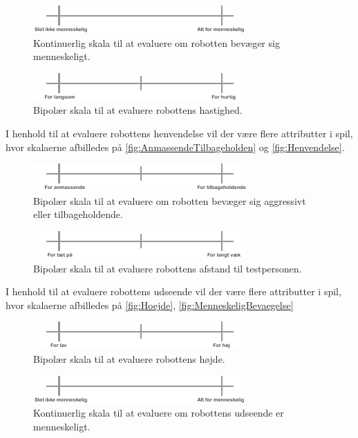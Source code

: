 \noindent
%
%
\begin{figure}[H]
\centering
\includegraphics[width =\textwidth]{Figure/Menneskelig} 
\caption{Kontinuerlig skala til at evaluere om robotten bevæger sig menneskeligt.}
\label{fig:MenneskeligBevaegelse}
\end{figure}
\noindent
%
%
\begin{figure}[H]
\centering
\includegraphics[width =\textwidth]{Figure/Hastighed} 
\caption{Bipolær skala til at evaluere robottens hastighed.}
\label{fig:Hastighed}
\end{figure}
\noindent
%
I henhold til at evaluere robottens henvendelse vil der være flere attributter i spil, hvor skalaerne afbilledes på \autoref{fig:AnmassendeTilbageholden} og \autoref{fig:Henvendelse}.  
%
\begin{figure}[H]
\centering
\includegraphics[width =\textwidth]{Figure/AnmasendeTilbageholden} 
\caption{Bipolær skala til at evaluere om robotten bevæger sig aggressivt eller tilbageholdende.}
\label{fig:AnmassendeTilbageholden}
\end{figure}
\noindent
%
%
\begin{figure}[H]
\centering
\includegraphics[width =\textwidth]{Figure/Henvendelse} 
\caption{Bipolær skala til at evaluere robottens afstand til testpersonen.}
\label{fig:Henvendelse}
\end{figure}
\noindent
%
I henhold til at evaluere robottens udseende vil der være flere attributter i spil, hvor skalaerne afbilledes på \autoref{fig:Hoejde}, \autoref{fig:MenneskeligBevaegelse}
%
\begin{figure}[H]
\centering
\includegraphics[width =\textwidth]{Figure/Hoejde} 
\caption{Bipolær skala til at evaluere robottens højde.}
\label{fig:Hoejde}
\end{figure}
\noindent
%
%
\begin{figure}[H]
\centering
\includegraphics[width =\textwidth]{Figure/Menneskelig} 
\caption{Kontinuerlig skala til at evaluere om robottens udseende er menneskeligt.}
\label{fig:MenneskeligUdseende}
\end{figure}
\noindent
%


